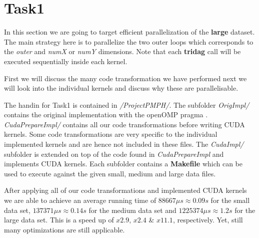 \section{Task1}
In this section we are going to target efficient parallelization of the
\textbf{large} dataset. The main strategy here is to parallelize the two outer
loops which corresponds to the \emph{outer} and \emph{numX} or \emph{numY}
dimensions. Note that each \textbf{tridag} call will be executed sequentially
inside each kernel.

First we will discuss the many code transformation we have performed
next we will look into the individual kernels and discuss why these
are parallelisable.

The handin for Task1 is contained in \emph{/ProjectPMPH/}. The subfolder
\emph{OrigImpl/} contains the original implementation with the openOMP pragma
. \emph{CudaPrepareImpl/} contains all our code transformations before writing
CUDA kernels. Some code transformations are very specific to the individual
implemented kernels and are hence not included in these files. The
\emph{CudaImpl/} subfolder is extended on top of the code found in
\emph{CudaPrepareImpl} and implements CUDA kernels.
Each subfolder contains a \textbf{Makefile} which can be used to execute against
the given small, medium and large data files.

After applying all of our code transformations and implemented CUDA kernels
we are able to achieve an average running time of $88667\mu s \approx 0.09s$
for the small data set, $137371\mu s \approx 0.14s$ for the medium data set and
$1225374\mu s \approx 1.2s$ for the large data set.
This is a speed up of $x2.9$, $x2.4$ \& $x11.1$, respectively. Yet, still many
optimizations are still applicable.
